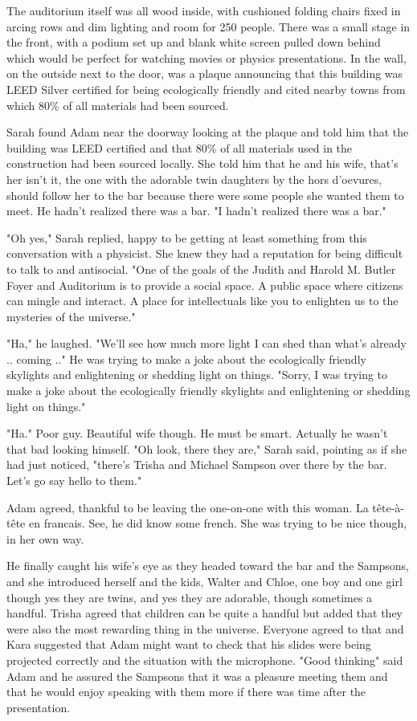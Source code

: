 The auditorium itself was all wood inside, with cushioned folding chairs fixed in arcing rows and dim lighting and room for 250 people. There was a small stage in the front, with a podium set up and blank white screen pulled down behind which would be perfect for watching movies or physics presentations. In the wall, on the outside next to the door, was a plaque announcing that this building was LEED Silver certified for being ecologically friendly and cited nearby towns from which 80\% of all materials had been sourced. 

\mypause

Sarah found Adam near the doorway looking at the plaque and told him that the building was LEED certified and that 80\% of all materials used in the construction had been sourced locally. She told him that he and his wife, that's her isn't it, the one with the adorable twin daughters by the hors d'oevures, should follow her to the bar because there were some people she wanted them to meet. He hadn't realized there was a bar. "I hadn't realized there was a bar."

"Oh yes," Sarah replied, happy to be getting at least something from this conversation with a physicist. She knew they had a reputation for being difficult to talk to and antisocial. "One of the goals of the Judith and Harold M. Butler Foyer and Auditorium is to provide a social space. A public space where citizens can mingle and interact. A place for intellectuals like you to enlighten us to the mysteries of the universe."  

"Ha," he laughed. "We'll see how much more light I can shed than what's already .. coming .." He was trying to make a joke about the ecologically friendly skylights and enlightening or shedding light on things. "Sorry, I was trying to make a joke about the ecologically friendly skylights and enlightening or shedding light on things." 

"Ha." Poor guy. Beautiful wife though. He must be smart. Actually he wasn't that bad looking himself. "Oh look, there they are," Sarah said, pointing as if she had just noticed, "there's Trisha and Michael Sampson over there by the bar. Let's go say hello to them."

Adam agreed, thankful to be leaving the one-on-one with this woman. La tête-à-tête en francais. See, he did know some french. She was trying to be nice though, in her own way.

He finally caught his wife's eye as they headed toward the bar and the Sampsons, and she introduced herself and the kids, Walter and Chloe, one boy and one girl though yes they are twins, and yes they are adorable, though sometimes a handful. Trisha agreed that children can be quite a handful but added that they were also the most rewarding thing in the universe. Everyone agreed to that and Kara suggested that Adam might want to check that his slides were being projected correctly and the situation with the microphone. "Good thinking" said Adam and he assured the Sampsons that it was a pleasure meeting them and that he would enjoy speaking with them more if there was time after the presentation. 

